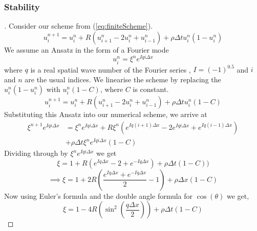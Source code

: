 \documentclass[a4paper]{article}
\begin{document}
	\subsubsection{Stability}
	\begin{proof}[]
	Consider our scheme from (\ref{eq:finiteScheme}). 
	    \begin{equation*}
	        u_{i}^{n+1} = u_{i}^{n} + R(u_{i+1}^{n}-2u_{i}^{n}+u_{i-1}^{n}) + \rho \Delta t u_{i}^{n}(1-u_{i}^{n})
	    \end{equation*}
	    We assume an Ansatz in the form of a Fourier mode
        \begin{equation*}
        u_{i}^{n} = \xi^{n}e^{Iqi\Delta x}
        \end{equation*}
        where $q$ is a real spatial wave number of the Fourier series , $I = (-1)^{0.5}$ and $i$ and $n$ are the usual indices. We linearise the scheme by replacing the $u_{i}^{n}(1-u_{i}^{n})$ with $u_{i}^{n}(1-C)$, where $C$ is constant.
        \begin{equation*}
            u_{i}^{n+1} = u_{i}^{n} + R(u_{i+1}^{n}-2u_{i}^{n}+u_{i-1}^{n}) + \rho \Delta t u_{i}^{n}(1-C)
        \end{equation*}
	    Substituting this Ansatz into our numerical scheme, we arrive at
        \begin{equation*}
        \begin{split}
            \xi^{n+1}e^{Iqi\Delta x} &= \xi^{n}e^{Iqi\Delta x} + R\xi^{n}(e^{Iq(i+1)\Delta x} - 2e^{Iqi\Delta x}
              + e^{Iq(i-1)\Delta x}) \\ 
             & + \rho\Delta t\xi^{n}e^{Iqi\Delta x}(1 - C)
        \end{split}
         \end{equation*}
        Dividing through by $\xi^{n}e^{Iqi\Delta x }$ we get 
        \begin{equation*}
            \xi = 1 + R(e^{Iq\Delta x} - 2 + e^{-Iq\Delta x})+\rho\Delta t(1 - C))
        \end{equation*}
        \begin{equation*}
             \implies \xi = 1 + 2R(\frac{e^{Iq\Delta x} + e^{-Iq\Delta x}}{2} - 1) + \rho\Delta x(1  - C )
        \end{equation*}
        Now using Euler's formula and the double angle formula for $\cos(\theta)$ we get,
        \begin{equation*}
             \xi = 1 - 4R(\sin^{2}(\frac{q\Delta x}{2}) ) + \rho \Delta t (1 - C)
        \end{equation*}

\end{proof}
\end{document}
